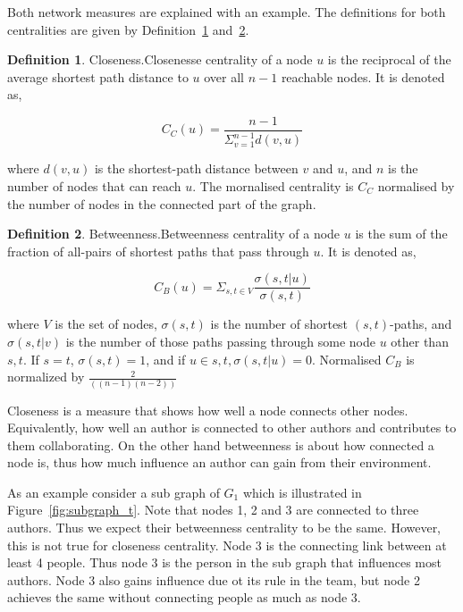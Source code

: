 \documentclass{article}
\theoremstyle{definition}
\newtheorem{definition}{Definition}[section]
\begin{document}
Both network measures are explained with an example. The definitions for both
centralities are given by Definition~\ref{def:closeness} and~\ref{def:betweenness}.

\begin{definition}{Closeness.}\label{def:closeness}
    Closenesse centrality of a node \(u\) is the reciprocal of the average
    shortest path distance to \(u\) over all \(n-1\) reachable nodes. It is denoted as,
    
    \[C_C(u)= \frac{n - 1}{\displaystyle \Sigma_{v=1}^{n-1}d(v, u)}\]
    
    where \(d(v, u)\) is the shortest-path distance between \(v\) and \(u\), and \(n\)
    is the number of nodes that can reach \(u\). The mornalised centrality
    is \(C_C\) normalised by the number of nodes in the connected part of the
    graph.
\end{definition}

\begin{definition}{Betweenness.}\label{def:betweenness}
Betweenness centrality of a node \(u\) is the sum of the fraction of all-pairs of
shortest paths that pass through \(u\). It is denoted as,

\[ C_B(u)=\Sigma_{s,t \in V} \frac{\sigma (s,t|u)}{\sigma(s,t)}\]

where \(V\) is the set of nodes, \(\sigma(s,t)\) is the number of shortest \((s,t)\)-paths,
and \(\sigma(s,t|v)\) is the number of those paths passing through some node
\(u\) other than \(s,t\). If \(s=t\), \(\sigma(s,t)=1\), and if \(u \in s,t, \sigma(s,t|u)=0\).
Normalised \(C_B\) is normalized by \(\frac{2}{((n-1)(n-2))}\)
\end{definition}

Closeness is a measure that shows how well a node connects other nodes. Equivalently,
how well an author is connected to other authors and contributes to them collaborating. 
On the other hand betweenness is about how connected a
node is, thus how much influence an author can gain from their environment.

As an example consider a sub graph of \(G_1\) which is illustrated in
Figure~\ref{fig:subgraph_t}. Note that nodes 1, 2 and 3 are connected to three
authors. Thus we expect their betweenness centrality to be the same. However, this
is not true for closeness centrality. Node 3 is the connecting link between at least
4 people. Thus node 3 is the person in the sub graph that influences most authors.
Node 3 also gains influence due ot its rule in the team, but node 2 achieves the
same without connecting people as much as node 3.
\end{document}
